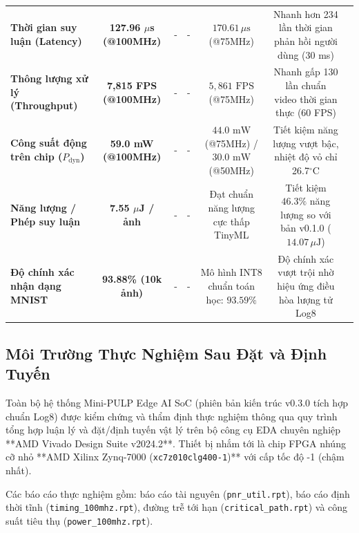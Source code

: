 \documentclass[conference]{IEEEtran}
\begin{document}
\begin{table}[t]
{\begin{tabular}{lcccccl}
\textbf{Thời gian suy luận (Latency)} & \textbf{127.96 $\mu$s (@100MHz)} & - & - & $170.61\,\mu\text{s}$ (@75MHz) & Nhanh hơn 234 lần thời gian phản hồi người dùng (30 ms) \\
\textbf{Thông lượng xử lý (Throughput)} & \textbf{7,815 FPS (@100MHz)} & - & - & $5,861\text{ FPS}$ (@75MHz) & Nhanh gấp 130 lần chuẩn video thời gian thực (60 FPS) \\
\textbf{Công suất động trên chip ($P_{\text{dyn}}$)} & \textbf{59.0 mW (@100MHz)} & - & - & $44.0\text{ mW}$ (@75MHz) / $30.0\text{ mW}$ (@50MHz) & Tiết kiệm năng lượng vượt bậc, nhiệt độ vỏ chỉ 26.7$^\circ$C \\
\textbf{Năng lượng / Phép suy luận} & \textbf{7.55 $\mu$J / ảnh} & - & - & Đạt chuẩn năng lượng cực thấp TinyML & Tiết kiệm $46.3\%$ năng lượng so với bản v0.1.0 ($14.07\,\mu\text{J}$) \\
\textbf{Độ chính xác nhận dạng MNIST} & \textbf{93.88\% (10k ảnh)} & - & - & Mô hình INT8 chuẩn toán học: $93.59\%$ & Độ chính xác vượt trội nhờ hiệu ứng điều hòa lượng tử Log8 \\
\bottomrule
\end{tabular}%
}
\end{table}

\subsection{Môi Trường Thực Nghiệm Sau Đặt và Định Tuyến}
\hspace*{1em} Toàn bộ hệ thống Mini-PULP Edge AI SoC (phiên bản kiến trúc v0.3.0 tích hợp chuẩn Log8) được kiểm chứng và thẩm định thực nghiệm thông qua quy trình tổng hợp luận lý và đặt/định tuyến vật lý trên bộ công cụ EDA chuyên nghiệp **AMD Vivado Design Suite v2024.2**. Thiết bị nhắm tới là chip FPGA nhúng cỡ nhỏ **AMD Xilinx Zynq-7000 (\texttt{xc7z010clg400-1})** với cấp tốc độ -1 (chậm nhất).

Các báo cáo thực nghiệm gồm: báo cáo tài nguyên (\texttt{pnr\_util.rpt}), báo cáo định thời tĩnh (\texttt{timing\_100mhz.rpt}), đường trễ tới hạn (\texttt{critical\_path.rpt}) và công suất tiêu thụ (\texttt{power\_100mhz.rpt}).
\end{document}
